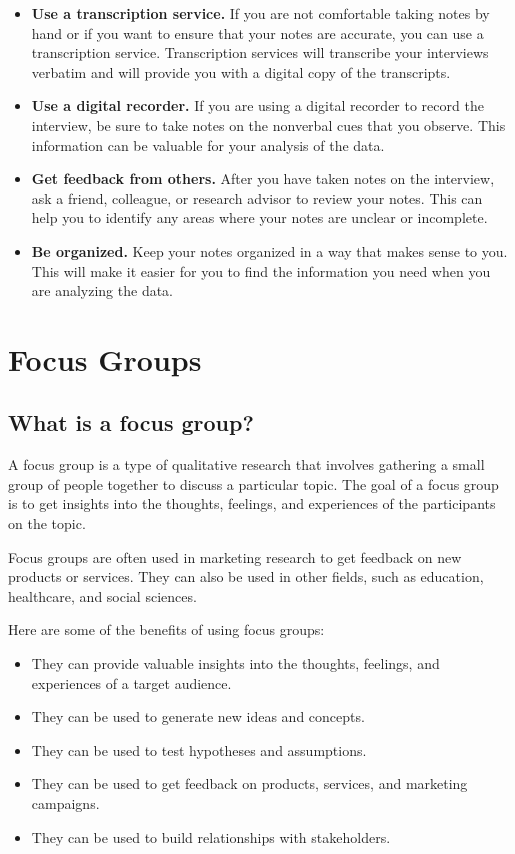 \documentclass[
  b5paper]{book}
\begin{document}
\begin{itemize}
\item
  \textbf{Use a transcription service.} If you are not comfortable taking notes by hand or if you want to ensure that your notes are accurate, you can use a transcription service. Transcription services will transcribe your interviews verbatim and will provide you with a digital copy of the transcripts.
\item
  \textbf{Use a digital recorder.} If you are using a digital recorder to record the interview, be sure to take notes on the nonverbal cues that you observe. This information can be valuable for your analysis of the data.
\item
  \textbf{Get feedback from others.} After you have taken notes on the interview, ask a friend, colleague, or research advisor to review your notes. This can help you to identify any areas where your notes are unclear or incomplete.
\item
  \textbf{Be organized.} Keep your notes organized in a way that makes sense to you. This will make it easier for you to find the information you need when you are analyzing the data.
\end{itemize}

\hypertarget{focus-groups-1}{%
\chapter{Focus Groups}\label{focus-groups-1}}

\hypertarget{what-is-a-focus-group}{%
\section{What is a focus group?}\label{what-is-a-focus-group}}

A focus group is a type of qualitative research that involves gathering a small group of people together to discuss a particular topic. The goal of a focus group is to get insights into the thoughts, feelings, and experiences of the participants on the topic.

Focus groups are often used in marketing research to get feedback on new products or services. They can also be used in other fields, such as education, healthcare, and social sciences.

Here are some of the benefits of using focus groups:

\begin{itemize}
\item
  They can provide valuable insights into the thoughts, feelings, and experiences of a target audience.
\item
  They can be used to generate new ideas and concepts.
\item
  They can be used to test hypotheses and assumptions.
\item
  They can be used to get feedback on products, services, and marketing campaigns.
\item
  They can be used to build relationships with stakeholders.
\end{itemize}
\end{document}
